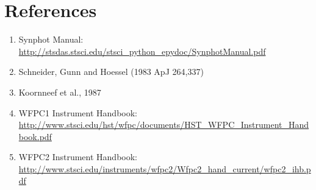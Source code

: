 \documentclass[letterpaper,10pt,english]{sphinxtsr}
\begin{document}
\chapter{References}
\label{references:references}\label{references::doc}\label{references:ref1}\begin{enumerate}
\item {} 
Synphot Manual: \href{http://stsdas.stsci.edu/stsci\_python\_epydoc/SynphotManual.pdf}{http://stsdas.stsci.edu/stsci\_python\_epydoc/SynphotManual.pdf}

\end{enumerate}
\label{references:ref2}\begin{enumerate}
\setcounter{enumi}{1}
\item {} 
Schneider, Gunn and Hoessel (1983 ApJ 264,337)

\end{enumerate}
\label{references:ref3}\begin{enumerate}
\setcounter{enumi}{2}
\item {} 
Koornneef et al., 1987

\end{enumerate}
\label{references:ref4}\begin{enumerate}
\setcounter{enumi}{3}
\item {} 
WFPC1 Instrument Handbook:
\href{http://www.stsci.edu/hst/wfpc/documents/HST\_WFPC\_Instrument\_Handbook.pdf}{http://www.stsci.edu/hst/wfpc/documents/HST\_WFPC\_Instrument\_Handbook.pdf}

\end{enumerate}
\label{references:ref5}\begin{enumerate}
\setcounter{enumi}{4}
\item {} 
WFPC2 Instrument Handbook:
\href{http://www.stsci.edu/instruments/wfpc2/Wfpc2\_hand\_current/wfpc2\_ihb.pdf}{http://www.stsci.edu/instruments/wfpc2/Wfpc2\_hand\_current/wfpc2\_ihb.pdf}

\end{enumerate}



\renewcommand{\indexname}{Index}
\printindex
\end{document}
